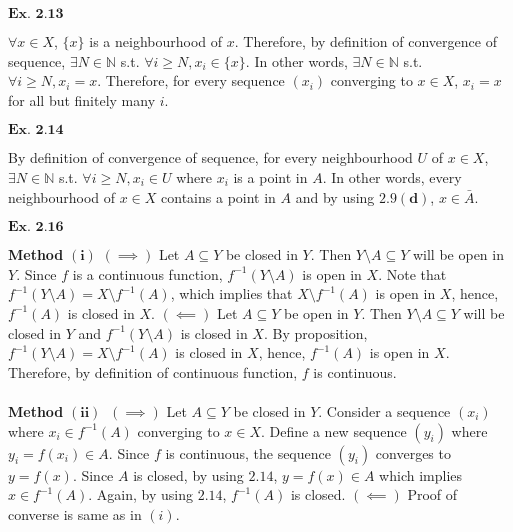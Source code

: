 \documentclass{article}
\begin{document}
${\textbf{Ex. 2.13}}$

$\forall x \in X$, $\{x\}$ is a neighbourhood of $x$. Therefore, by definition of convergence of sequence, $\exists N \in \mathbb{N}$ s.t. $\forall i \geq N, x_i \in \{x\}$. In other words, $\exists N \in \mathbb{N}$ s.t. $\forall i \geq N, x_i = x$. Therefore, for every sequence $(x_i)$ converging to $x \in X$, $x_i = x$ for all but finitely many $i$.

\vspace{0.2in}

${\textbf{Ex. 2.14}}$

By definition of convergence of sequence, for every neighbourhood $U$ of $x \in X$, $\exists N \in \mathbb{N}$ s.t. $\forall i \geq N, x_i \in U$ where $x_i$ is a point in $A$. In other words, every neighbourhood of $x \in X$ contains a point in $A$ and by using $\mathbf{2.9(d)}$, $x \in \bar{A}$.

\vspace{0.2in}

${\textbf{Ex. 2.16}}$

\textbf{Method} $\mathbf{(i)}$ $(\implies)$ Let $A \subseteq Y$ be closed in $Y$. Then $Y \setminus A \subseteq Y$ will be open in $Y$. Since $f$ is a continuous function, $f^{-1}(Y\setminus A)$ is open in $X$. Note that $f^{-1}(Y\setminus A) = X \setminus f^{-1}(A)$, which implies that $X \setminus f^{-1}(A)$ is open in $X$, hence, $f^{-1}(A)$ is closed in $X$. $(\impliedby)$ Let $A \subseteq Y$ be open in $Y$. Then $Y \setminus A \subseteq Y$ will be closed in $Y$ and $f^{-1}(Y\setminus A)$ is closed in $X$. By proposition, $f^{-1}(Y\setminus A) = X \setminus f^{-1}(A)$ is closed in $X$, hence, $f^{-1}(A)$ is open in $X$. Therefore, by definition of continuous function, $f$ is continuous.\\~\\

\textbf{Method} $\mathbf{(ii)}$ $\ (\implies)$ Let $A \subseteq Y$ be closed in $Y$. Consider a sequence $(x_i)$ where $x_i \in f^{-1}(A)$ converging to $x \in X$. Define a new sequence $(y_i)$ where $y_i = f(x_i) \in A$. Since $f$ is continuous, the sequence $(y_i)$ converges to $y = f(x)$. Since $A$ is closed, by using $\mathbf{2.14}$, $y = f(x) \in A$ which implies $x \in f^{-1}(A)$. Again, by using $\mathbf{2.14}$, $f^{-1}(A)$ is closed. $(\impliedby)$ Proof of converse is same as in $(i)$.

\vspace{0.2in}
\end{document}
